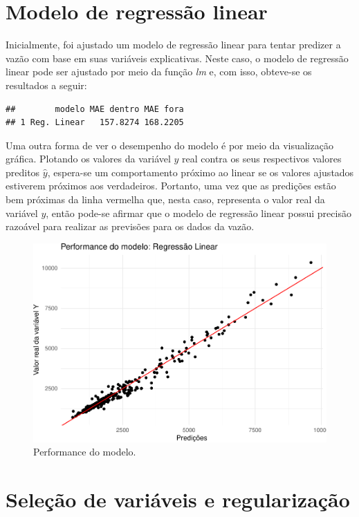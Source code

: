 \documentclass[11pt,]{article}
\begin{document}
\hypertarget{modelo-de-regressuxe3o-linear-1}{%
\section{Modelo de regressão
linear}\label{modelo-de-regressuxe3o-linear-1}}

Inicialmente, foi ajustado um modelo de regressão linear para tentar
predizer a vazão com base em suas variáveis explicativas. Neste caso, o
modelo de regressão linear pode ser ajustado por meio da função
\textit{lm} e, com isso, obteve-se os resultados a seguir:

\begin{verbatim}
##        modelo MAE dentro MAE fora
## 1 Reg. Linear   157.8274 168.2205
\end{verbatim}

Uma outra forma de ver o desempenho do modelo é por meio da visualização
gráfica. Plotando os valores da variável \(y\) real contra os seus
respectivos valores preditos \(\widehat{y}\), espera-se um comportamento
próximo ao linear se os valores ajustados estiverem próximos aos
verdadeiros. Portanto, uma vez que as predições estão bem próximas da
linha vermelha que, nesta caso, representa o valor real da variável
\(y\), então pode-se afirmar que o modelo de regressão linear possui
precisão razoável para realizar as previsões para os dados da vazão.

\begin{figure}

{\centering \includegraphics[width=0.6\linewidth]{figs/unnamed-chunk-6} 

}

\caption{Performance do modelo.}\label{fig:unnamed-chunk-6}
\end{figure}

\hypertarget{seleuxe7uxe3o-de-variuxe1veis-e-regularizauxe7uxe3o-1}{%
\section{Seleção de variáveis e
regularização}\label{seleuxe7uxe3o-de-variuxe1veis-e-regularizauxe7uxe3o-1}}
\end{document}
